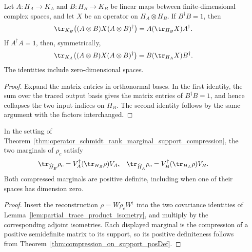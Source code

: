 \begin{lemma}
    \label{lem:partial_trace_product_isometry}
    \leanok
    Let $A:H_A\to K_A$ and $B:H_B\to K_B$ be linear maps between
    finite-dimensional complex spaces, and let $X$ be an operator on
    $H_A\otimes H_B$. If $B^\dagger B=1$, then
    \begin{align}
        \tr_{K_B}\!\left((A\otimes B)X(A\otimes B)^\dagger\right)
         & =A(\tr_{H_B}X)A^\dagger.
        \notag
    \end{align}
    If $A^\dagger A=1$, then, symmetrically,
    \begin{align}
        \tr_{K_A}\!\left((A\otimes B)X(A\otimes B)^\dagger\right)
         & =B(\tr_{H_A}X)B^\dagger.
        \notag
    \end{align}
    The identities include zero-dimensional spaces.
\end{lemma}
\begin{proof}\leanok
    Expand the matrix entries in orthonormal bases. In the first identity, the
    sum over the traced output basis gives the matrix entries of
    $B^\dagger B=1$, and hence collapses the two input indices on $H_B$.
    The second identity follows by the same argument with the factors
    interchanged.
\end{proof}

\begin{theorem}
    \label{thm:faithful_marginals_support_compression}
    \leanok
    In the setting of
    Theorem~\ref{thm:operator_schmidt_rank_marginal_support_compression}, the
    two marginals of $\rho_c$ satisfy
    \begin{align}
        \tr_{\widehat H_B}\rho_c
         & =V_A^\dagger(\tr_{H_B}\rho)V_A,
         &
        \tr_{\widehat H_A}\rho_c
         & =V_B^\dagger(\tr_{H_A}\rho)V_B.
        \notag
    \end{align}
    Both compressed marginals are positive definite, including when one of
    their spaces has dimension zero.
\end{theorem}
\begin{proof}\leanok
    Insert the reconstruction $\rho=W\rho_cW^\dagger$ into the two covariance
    identities of Lemma~\ref{lem:partial_trace_product_isometry}, and multiply
    by the corresponding adjoint isometries. Each displayed marginal is the
    compression of a positive semidefinite matrix to its support, so its
    positive definiteness follows from
    Theorem~\ref{thm:compression_on_support_posDef}.
\end{proof}

